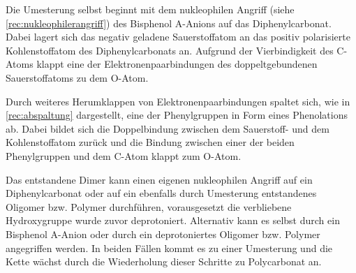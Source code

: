 Die Umesterung selbst beginnt mit dem nukleophilen Angriff (siehe
\autoref{rec:nukleophilerangriff}) des Bisphenol A-Anions auf das
Diphenylcarbonat. Dabei lagert sich das negativ geladene Sauerstoffatom an das
positiv polarisierte Kohlenstoffatom des Diphenylcarbonats an. Aufgrund der
Vierbindigkeit des C-Atoms \glqq klappt\grqq{} eine der Elektronenpaarbindungen
des doppeltgebundenen Sauerstoffatoms zu dem O-Atom.

Durch weiteres \glqq Herumklappen\grqq{} von Elektronenpaarbindungen spaltet
sich, wie in \autoref{rec:abspaltung} dargestellt, eine der Phenylgruppen in
Form eines Phenolations ab. Dabei bildet sich die Doppelbindung zwischen dem
Sauerstoff- und dem Kohlenstoffatom zurück und die Bindung zwischen einer der
beiden Phenylgruppen und dem C-Atom \glqq klappt\grqq{} zum O-Atom.

Das entstandene Dimer kann einen eigenen nukleophilen Angriff auf ein
Diphenylcarbonat oder auf ein ebenfalls durch Umesterung entstandenes Oligomer
bzw. Polymer durchführen, vorausgesetzt die verbliebene Hydroxygruppe wurde
zuvor deprotoniert. Alternativ kann es selbst durch ein Bisphenol A-Anion oder
durch ein deprotoniertes Oligomer bzw. Polymer angegriffen werden. In beiden
Fällen kommt es zu einer Umesterung und die Kette wächst durch die Wiederholung
dieser Schritte zu Polycarbonat an.

